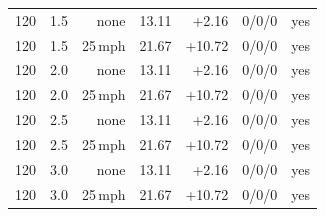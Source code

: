 \begin{table}[t]
\begin{tabular}{rrrrrrc}
120 & 1.5 & none & 13.11 & +2.16 & 0/0/0 & yes \\
120 & 1.5 & 25\,mph & 21.67 & +10.72 & 0/0/0 & yes \\
120 & 2.0 & none & 13.11 & +2.16 & 0/0/0 & yes \\
120 & 2.0 & 25\,mph & 21.67 & +10.72 & 0/0/0 & yes \\
120 & 2.5 & none & 13.11 & +2.16 & 0/0/0 & yes \\
120 & 2.5 & 25\,mph & 21.67 & +10.72 & 0/0/0 & yes \\
120 & 3.0 & none & 13.11 & +2.16 & 0/0/0 & yes \\
120 & 3.0 & 25\,mph & 21.67 & +10.72 & 0/0/0 & yes \\
\bottomrule\end{tabular}\end{table}
